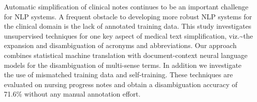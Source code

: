 Automatic simplification of clinical notes continues to be an important challenge for NLP systems. A frequent obstacle to developing more robust NLP systems for the clinical domain is the lack of annotated training data. This study investigates unsupervised techniques for one key aspect of medical text simplification, viz.{\textasciitilde}the expansion   and disambiguation of acronyms and abbreviations. Our approach combines statistical machine translation with document-context neural language models for the disambiguation of multi-sense terms.  In addition we investigate the use of mismatched training data and self-training. These techniques are evaluated on nursing progress notes and obtain a disambiguation accuracy of 71.6\% without any manual annotation effort.
